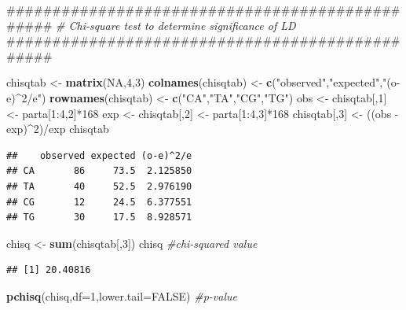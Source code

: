 \documentclass[]{article}
\newenvironment{Shaded}{\begin{snugshade}}{\end{snugshade}}
\newcommand{\KeywordTok}[1]{\textcolor[rgb]{0.13,0.29,0.53}{\textbf{{#1}}}}
\newcommand{\DataTypeTok}[1]{\textcolor[rgb]{0.13,0.29,0.53}{{#1}}}
\newcommand{\DecValTok}[1]{\textcolor[rgb]{0.00,0.00,0.81}{{#1}}}
\newcommand{\StringTok}[1]{\textcolor[rgb]{0.31,0.60,0.02}{{#1}}}
\newcommand{\CommentTok}[1]{\textcolor[rgb]{0.56,0.35,0.01}{\textit{{#1}}}}
\newcommand{\OtherTok}[1]{\textcolor[rgb]{0.56,0.35,0.01}{{#1}}}
\newcommand{\NormalTok}[1]{{#1}}
\begin{document}
\begin{Shaded}
\begin{Highlighting}[]
\NormalTok{################################################}
\CommentTok{# Chi-square test to determine significance of LD}
\NormalTok{################################################}

\NormalTok{chisqtab <-}\StringTok{ }\KeywordTok{matrix}\NormalTok{(}\OtherTok{NA}\NormalTok{,}\DecValTok{4}\NormalTok{,}\DecValTok{3}\NormalTok{)}
\KeywordTok{colnames}\NormalTok{(chisqtab) <-}\StringTok{ }\KeywordTok{c}\NormalTok{(}\StringTok{"observed"}\NormalTok{,}\StringTok{"expected"}\NormalTok{,}\StringTok{"(o-e)^2/e"}\NormalTok{)}
\KeywordTok{rownames}\NormalTok{(chisqtab) <-}\StringTok{ }\KeywordTok{c}\NormalTok{(}\StringTok{"CA"}\NormalTok{,}\StringTok{"TA"}\NormalTok{,}\StringTok{"CG"}\NormalTok{,}\StringTok{"TG"}\NormalTok{)}
\NormalTok{obs <-}\StringTok{ }\NormalTok{chisqtab[,}\DecValTok{1}\NormalTok{] <-}\StringTok{ }\NormalTok{parta[}\DecValTok{1}\NormalTok{:}\DecValTok{4}\NormalTok{,}\DecValTok{2}\NormalTok{]*}\DecValTok{168}
\NormalTok{exp <-}\StringTok{ }\NormalTok{chisqtab[,}\DecValTok{2}\NormalTok{] <-}\StringTok{ }\NormalTok{parta[}\DecValTok{1}\NormalTok{:}\DecValTok{4}\NormalTok{,}\DecValTok{3}\NormalTok{]*}\DecValTok{168}
\NormalTok{chisqtab[,}\DecValTok{3}\NormalTok{] <-}\StringTok{ }\NormalTok{((obs -}\StringTok{ }\NormalTok{exp)^}\DecValTok{2}\NormalTok{)/exp}
\NormalTok{chisqtab}
\end{Highlighting}
\end{Shaded}

\begin{verbatim}
##    observed expected (o-e)^2/e
## CA       86     73.5  2.125850
## TA       40     52.5  2.976190
## CG       12     24.5  6.377551
## TG       30     17.5  8.928571
\end{verbatim}

\begin{Shaded}
\begin{Highlighting}[]
\NormalTok{chisq <-}\StringTok{ }\KeywordTok{sum}\NormalTok{(chisqtab[,}\DecValTok{3}\NormalTok{])}
\NormalTok{chisq                               }\CommentTok{#chi-squared value}
\end{Highlighting}
\end{Shaded}

\begin{verbatim}
## [1] 20.40816
\end{verbatim}

\begin{Shaded}
\begin{Highlighting}[]
\KeywordTok{pchisq}\NormalTok{(chisq,}\DataTypeTok{df=}\DecValTok{1}\NormalTok{,}\DataTypeTok{lower.tail=}\OtherTok{FALSE}\NormalTok{) }\CommentTok{#p-value}
\end{Highlighting}
\end{Shaded}
\end{document}
